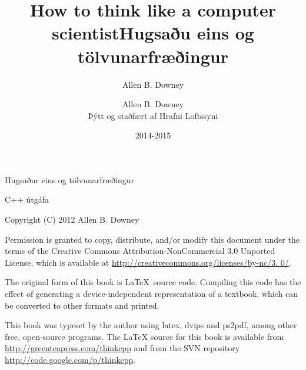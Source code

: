 \documentclass{book}
\title{How to think like a computer scientist}
\author{Allen B. Downey}
\date{}
\begin{document}
\title {Hugsaðu eins og tölvunarfræðingur}
\author {Allen B. Downey \\
Þýtt og staðfært af Hrafni Loftssyni}
\date {2014-2015}
\maketitle

\vspace{2in}
\begin{center}
{\Large Hugsaður eins og tölvunarfræðingur}

C++ útgáfa
\vspace{0.25in}

Copyright (C) 2012  Allen B. Downey
\end{center}
\vspace{0.25in}

Permission is granted to copy, distribute, and/or modify this document
under the terms of the Creative Commons Attribution-NonCommercial 3.0 Unported
License, which is available at \url{http://creativecommons.org/licenses/by-nc/3.
0/}.

The original form of this book is \LaTeX\ source code.  Compiling this
code has the effect of generating a device-independent representation
of a textbook, which can be converted to other formats and printed.

This book was typeset by the author using latex, dvips and ps2pdf,
among other free, open-source programs.
The LaTeX source for this book is available from
\url{http://greenteapress.com/thinkcpp} and from the SVN repository
\url{http://code.google.com/p/thinkcpp}.


\frontmatter
\tableofcontents

\mainmatter
















%

\printindex
\end{document}
